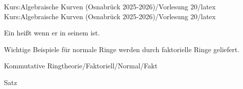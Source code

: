 Kurs:Algebraische Kurven (Osnabrück 2025-2026)/Vorlesung 20/latex
Kurs:Algebraische Kurven (Osnabrück 2025-2026)/Vorlesung 20/latex

\setcounter{section}{20}





{}

{


Ein
heißt  wenn er
in seinem
ist.


}


Wichtige Beispiele für normale Ringe werden durch faktorielle Ringe geliefert.



{Kommutative Ringtheorie/Faktoriell/Normal/Fakt}

{Satz}

{}

{


\faktsituation {}



\faktzusatz {}

\faktzusatz {}


}


